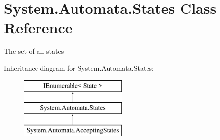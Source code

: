 \hypertarget{class_system_1_1_automata_1_1_states}{}\section{System.\+Automata.\+States Class Reference}
\label{class_system_1_1_automata_1_1_states}


The set of all states  


Inheritance diagram for System.\+Automata.\+States\+:\begin{figure}[H]
\begin{center}
\leavevmode
\includegraphics[height=3.000000cm]{class_system_1_1_automata_1_1_states}
\end{center}
\end{figure}

